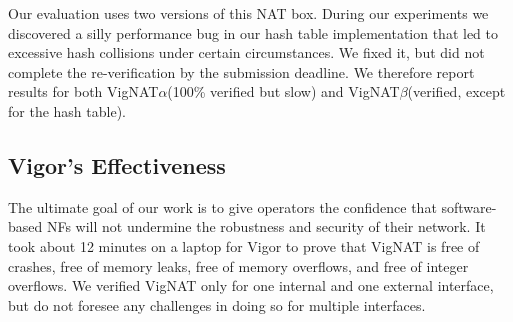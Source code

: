 \documentclass[letterpaper,twocolumn,10pt]{article}
\newcommand{\vignat}{{\sc VigNAT}\xspace}
\newcommand{\vignata}{{\sc VigNAT$\alpha$}\xspace}
\newcommand{\vignatb}{{\sc VigNAT$\beta$}\xspace}
\begin{document}

Our evaluation uses two versions of this NAT box. During our experiments we
discovered a silly performance bug in our hash table implementation that led to
excessive hash collisions under certain circumstances. We fixed it, but did not
complete the re-verification by the submission deadline. We therefore report
results for both \vignata (100\% verified but slow) and \vignatb (verified,
except for the hash table).

\subsection{Vigor's Effectiveness}
\label{sec:effectiveness}

The ultimate goal of our work is to give operators the confidence that
software-based NFs will not undermine the robustness and security of their
network. It took about 12 minutes on a laptop for Vigor to prove that \vignat is
free of crashes, free of memory leaks, free of memory overflows, and free of
integer overflows. We verified \vignat only for one internal and one external
interface, but do not foresee any challenges in doing so for multiple
interfaces.
\end{document}
